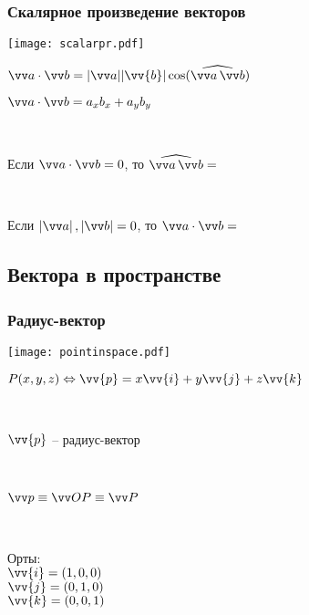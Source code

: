 \documentclass[10pt]{beamer}
\begin{document}
    \begin{frame}\frametitle{Скалярное произведение векторов}
    {
    	{
    		
			\texttt{[image: scalarpr.pdf]}
    		
    		
    	}
    	{
    		$\VV{a} \cdot \VV{b} = |\VV{a}||\vv{b}|\cos(\widehat{\VV{a} \, \VV{b}})$ 
    		
    		\hfill
    		
    		$\VV{a} \cdot \VV{b} = a_xb_x + a_yb_y $
    		
    		~
    		
    		\pause Если $\VV{a} \cdot \VV{b} = 0$, то $\widehat{\VV{a} \, \VV{b}} =$ 
    		
    		~
    		
    		\pause Если $\ABS{\VV{a}},\ABS{\VV{b}} = 0$, то  $\VV{a} \cdot \VV{b} =$ 		
    	
    	
    		
    	}
    	
    
    	
    }
	\end{frame}
	


\subsection{Вектора в пространстве}

\begin{frame}\frametitle{Радиус-вектор}
{
	{
		
		\texttt{[image: pointinspace.pdf]}
		
	}
	{
		$P(x,y,z) \Leftrightarrow \vv{p}=x\vv{i} + y\vv{j} + z\vv{k} $
		
		~
		
		$\vv{p}$ -- радиус-вектор	
		
		~
		
		$\VV p \equiv \VV {OP} \equiv \VV P$
		
		~
		
		Орты:\\
		$\vv{i}=(1,0,0)$\\
		$\vv{j}=(0,1,0)$\\
		$\vv{k}=(0,0,1)$
		 
		
		
	}
}
\end{frame}
\end{document}

